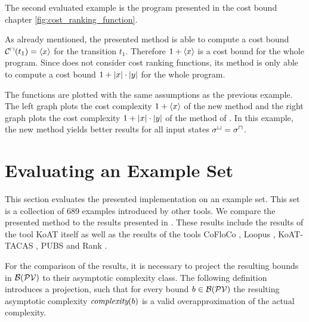 The second evaluated example is the program presented in the cost bound chapter \ref{fig:cost_ranking_function}.



As already mentioned, the presented method is able to compute a cost bound ${\mathcal{C}^\sqcap}(t_1) = \left\langle x \right\rangle$ for the transition $t_1$.
Therefore $1 + \left\langle x \right\rangle$ is a cost bound for the whole program.
Since \cite{koat} does not consider cost ranking functions, its method is only able to compute a cost bound $1 + \left|x\right| \cdot \left|y\right|$ for the whole program.

The functions are plotted with the same assumptions as the previous example.
The left graph plots the cost complexity $1 + \left\langle x \right\rangle$ of the new method and the right graph plots the cost complexity $1 + \left|x\right| \cdot \left|y\right|$ of the method of \cite{koat}.
In this example, the new method yields better results for all input states ${\sigma^\sqcup} = {\sigma^\sqcap}$.

\section{Evaluating an Example Set}

This section evaluates the presented implementation on an example set.
This set is a collection of 689 examples introduced by other tools.
We compare the presented method to the results presented in \cite{koat}.
These results include the results of the tool KoAT itself as well as the results of the tools CoFloCo \cite{cofloco1, cofloco2}, Loopus \cite{loopus1, loopus2}, KoAT-TACAS \cite{leike2014ranking}, PUBS \cite{pubs1, pubs2} and Rank \cite{rank}.

For the comparison of the results, it is necessary to project the resulting bounds in $\mathcal{B}(\mathcal{PV})$ to their asymptotic complexity class.
The following definition introduces a projection, such that for every bound $b \in \mathcal{B}(\mathcal{PV})$ the resulting asymptotic complexity $\emph{complexity}(b)$ is a valid overapproximation of the actual complexity.

